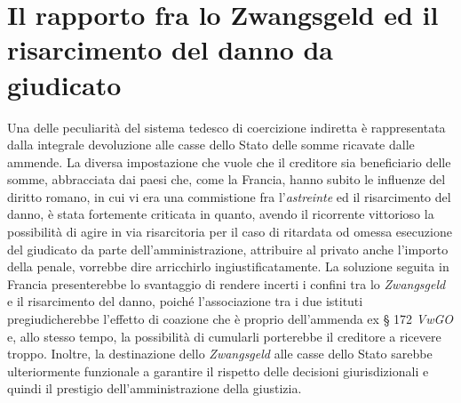 \documentclass[12pt,it,a4paper,]{report}
\begin{document}
\hypertarget{il-rapporto-fra-lo-zwangsgeld-ed-il-risarcimento-del-danno-da-giudicato}{%
\section{Il rapporto fra lo Zwangsgeld ed il risarcimento del danno da
giudicato}\label{il-rapporto-fra-lo-zwangsgeld-ed-il-risarcimento-del-danno-da-giudicato}}

Una delle peculiarità del sistema tedesco di coercizione indiretta è
rappresentata dalla integrale devoluzione alle casse dello Stato delle
somme ricavate dalle ammende. La diversa impostazione che vuole che il
creditore sia beneficiario delle somme, abbracciata dai paesi che, come
la Francia, hanno subito le influenze del diritto romano, in cui vi era
una commistione fra l'\emph{astreinte} ed il risarcimento del danno, è
stata fortemente criticata in quanto, avendo il ricorrente vittorioso la
possibilità di agire in via risarcitoria per il caso di ritardata od
omessa esecuzione del giudicato da parte dell'amministrazione,
attribuire al privato anche l'importo della penale, vorrebbe dire
arricchirlo ingiustificatamente. La soluzione seguita in Francia
presenterebbe lo svantaggio di rendere incerti i confini tra lo
\emph{Zwangsgeld} e il risarcimento del danno, poiché l'associazione tra
i due istituti pregiudicherebbe l'effetto di coazione che è proprio
dell'ammenda ex § 172 \emph{VwGO} e, allo stesso tempo, la possibilità
di cumularli porterebbe il creditore a ricevere troppo. Inoltre, la
destinazione dello \emph{Zwangsgeld} alle casse dello Stato sarebbe
ulteriormente funzionale a garantire il rispetto delle decisioni
giurisdizionali e quindi il prestigio dell'amministrazione della
giustizia.
\end{document}
